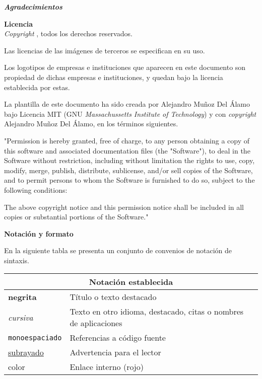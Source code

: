 


{\large \textbf{\textit{Agradecimientos}}}
\lorem

\blankpage

{\large \textbf{Licencia}}\\

\textit{Copyright}  \autor, todos los derechos reservados.

Las licencias de las imágenes de terceros se especifican en su uso. \newline

Los logotipos de empresas e instituciones que aparecen en este
documento son propiedad de dichas empresas e instituciones, y quedan bajo la licencia
establecida por estas. \newline

La plantilla de este documento ha sido creada por Alejandro Muñoz Del Álamo bajo 
Licencia MIT (GNU \textit{Massachussetts Institute of Technology}) y con 
{\itshape copyright } Alejandro Muñoz Del Álamo, en los términos siguientes.
{\ithape "Permission is hereby granted, free of charge, to any person obtaining a copy of 
this software and associated documentation files (the "Software"), to deal in the Software 
without restriction, including without limitation the rights to use, copy, modify, merge, 
publish, distribute, sublicense, and/or sell copies of the Software, and to permit persons 
to whom the Software is furnished to do so, subject to the following conditions:

The above copyright notice and this permission notice shall be included in all copies or 
substantial portions of the Software."}

\blankpage

{\large \textbf{Notación y formato}} \smallskip 

En la siguiente tabla se presenta un conjunto de convenios de notación de sintaxis.\smallskip 

\begin{tabular}{|l|l}
    \hline \multicolumn{2}{|c|}{Notación establecida} \\ \hline
    \textbf{negrita} & Título o texto destacado \\ \hline 
    \textit{cursiva} & Texto en otro idioma, destacado, citas o nombres de aplicaciones \\ \hline
    \texttt{monoespaciado} & Referencias a código fuente \\ \hline
    \underline{subrayado} & Advertencia para el lector \\ \hline
    color & Enlace interno (rojo) \\ \hline
\end{tabular}

